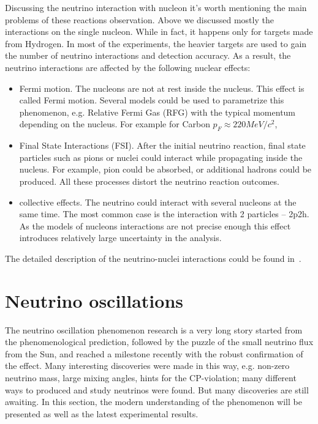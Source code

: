 \documentclass[../main.tex]{subfiles}
\begin{document}
Discussing the neutrino interaction with nucleon it's worth mentioning the main problems of these reactions observation. Above we discussed mostly the interactions on the single nucleon. While in fact, it happens only for targets made from Hydrogen. In most of the experiments, the heavier targets are used to gain the number of neutrino interactions and detection accuracy. As a result, the neutrino interactions are affected by the following nuclear effects:
\begin{itemize}
  \item Fermi motion. The nucleons are not at rest inside the nucleus. This effect is called Fermi motion. Several models could be used to parametrize this phenomenon, e.g. Relative Fermi Gas (RFG) with the typical momentum depending on the nucleus. For example for Carbon $p_F\approx 220 MeV/c^2$,
  \item Final State Interactions (FSI). After the initial neutrino reaction, final state particles such as pions or nuclei could interact while propagating inside the nucleus. For example, pion could be absorbed, or additional hadrons could be produced. All these processes distort the neutrino reaction outcomes.
  \item collective effects. The neutrino could interact with several nucleons at the same time. The most common case is the interaction with 2 particles -- 2p2h. As the models of nucleons interactions are not precise enough this effect introduces relatively large uncertainty in the analysis.
\end{itemize}

The detailed description of the neutrino-nuclei interactions could be found in~\cite{Formaggio2012}.


\section{Neutrino oscillations}
\label{sec:intro:osc}
The neutrino oscillation phenomenon research is a very long story started from the phenomenological prediction, followed by the puzzle of the small neutrino flux from the Sun, and reached a milestone recently with the robust confirmation of the effect. Many interesting discoveries were made in this way, e.g. non-zero neutrino mass, large mixing angles, hints for the CP-violation; many different ways to produced and study neutrinos were found. But many discoveries are still awaiting. In this section, the modern understanding of the phenomenon will be presented as well as the latest experimental results.
\end{document}
